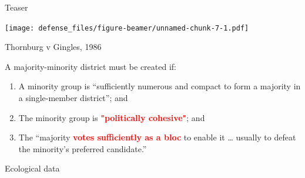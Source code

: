 \documentclass[ignorenonframetext,]{beamer}
\newcommand{\red}[1]{\textcolor{red}{#1}}
\begin{document}
\begin{frame}{Teaser}

\texttt{[image: defense\_files/figure-beamer/unnamed-chunk-7-1.pdf]}

\end{frame}

\begin{frame}{Thornburg v Gingles, 1986}

A majority-minority district must be created if:

\begin{enumerate}
\def\labelenumi{\arabic{enumi}.}
\item
  A minority group is ``sufficiently numerous and compact to form a
  majority in a single-member district''; and
\item
  The minority group is \red{\textbf{"politically cohesive"}}; and
\item
  The ``majority \red{\textbf{votes sufficiently as a bloc}} to enable
  it \ldots{} usually to defeat the minority's preferred candidate.''
\end{enumerate}

\end{frame}

\begin{frame}{Ecological data}


\end{frame}
\end{document}

